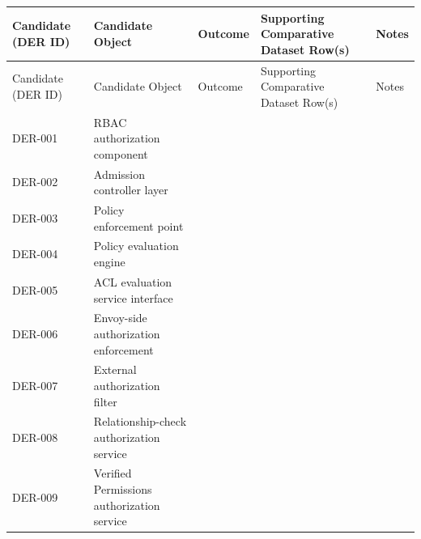 \documentclass{article}
\begin{document}
\begin{longtable}{@{}p{}p{}p{}p{}p{}@{}}
\toprule
Candidate (DER ID) & Candidate Object & Outcome & Supporting Comparative Dataset Row(s) & Notes\\
\midrule
\endfirsthead
\toprule
Candidate (DER ID) & Candidate Object & Outcome & Supporting Comparative Dataset Row(s) & Notes\\
\midrule
\endhead
DER-001 & RBAC authorization component &  &  & \\
DER-002 & Admission controller layer &  &  & \\
DER-003 & Policy enforcement point &  &  & \\
DER-004 & Policy evaluation engine &  &  & \\
DER-005 & ACL evaluation service interface &  &  & \\
DER-006 & Envoy-side authorization enforcement &  &  & \\
DER-007 & External authorization filter &  &  & \\
DER-008 & Relationship-check authorization service &  &  & \\
DER-009 & Verified Permissions authorization service &  &  & \\
\bottomrule
\end{longtable}
\end{document}
